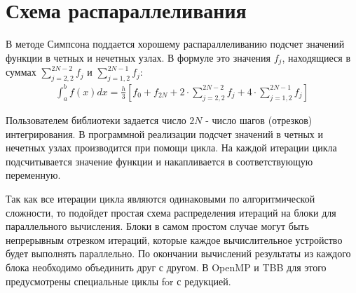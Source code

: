 \documentclass{report}
\begin{document}
\section*{Схема распараллеливания}
В методе Симпсона поддается хорошему распараллеливанию подсчет значений функции в четных и нечетных узлах. В формуле это значения $f_j$, находящиеся в суммах $\sum_{j=2,2}^{2 N-2} f_{j}$ и $\sum_{j=1,2}^{2 N-1} f_{j}$:
\begin{equation}
\begin{array}{l}
\int_{a}^{b} f(x) d x = \frac{h}{3}\left[f_{0}+f_{2 N}+2 \cdot \sum_{j=2,2}^{2 N-2} f_{j}+4 \cdot \sum_{j=1,2}^{2 N-1} f_{j}\right]
\end{array}
\end{equation}
\par Пользователем библиотеки задается число $2N$ - число шагов (отрезков) интегрирования. В программной реализации подсчет значений в четных и нечетных узлах производится при помощи цикла. На каждой итерации цикла подсчитывается значение функции и накапливается в соответствующую переменную.
\par Так как все итерации цикла являются одинаковыми по алгоритмической сложности, то подойдет простая схема распределения итераций на блоки для параллельного вычисления. Блоки в самом простом случае могут быть непрерывным отрезком итераций, которые каждое вычислительное устройство будет выполнять параллельно. По окончании вычислений результаты из каждого блока необходимо объединить друг с другом. В OpenMP и TBB для этого предусмотрены специальные циклы for с редукцией.
\newpage
\end{document}
